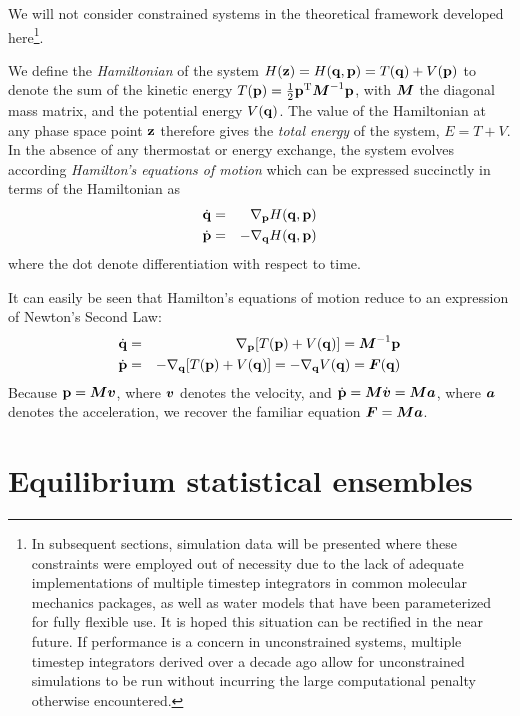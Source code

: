 We will not consider constrained systems in the theoretical framework developed here\footnote{In subsequent sections, simulation data will be presented where these constraints were employed out of necessity due to the lack of adequate implementations of multiple timestep integrators in common molecular mechanics packages, as well as water models that have been parameterized for fully flexible use.  It is hoped this situation can be rectified in the near future.  If performance is a concern in unconstrained systems, multiple timestep integrators derived over a decade ago \cite{tuckerman:1992a} allow for unconstrained simulations to be run without incurring the large computational penalty otherwise encountered.}.

We define the \emph{Hamiltonian} of the system $H({\bf z}) = H({\bf q},{\bf p}) = T({\bf q}) + V({\bf p})$ to denote the sum of the kinetic energy $T({\bf p}) = \frac{1}{2} {\bf p}^{\mathrm{T}} {\mbox{\boldmath{$M$}}}^{-1} {\bf p}$, with ${\mbox{\boldmath{$M$}}}$ the diagonal mass matrix, and the potential energy $V({\bf q})$.  \label{notation:Hamiltonian}
The value of the Hamiltonian at any phase space point ${\bf z}$ therefore gives the \emph{total energy} of the system, $E = T + V$.  \label{notation:total-energy}
In the absence of any thermostat or energy exchange, the system evolves according \emph{Hamilton's equations of motion} which can be expressed succinctly in terms of the Hamiltonian as  
\begin{eqnarray}
\dot{{\bf q}} &=& \nabla_{{\bf p}} H({\bf q},{\bf p}) \nonumber \\
\dot{{\bf p}} &=& - \nabla_{{\bf q}} H({\bf q},{\bf p})
\end{eqnarray}
where the dot denote differentiation with respect to time. 

It can easily be seen that Hamilton's equations of motion reduce to an expression of Newton's Second Law:
\begin{eqnarray}
\dot{{\bf q}} &=& \nabla_{{\bf p}} [T({\bf p}) + V({\bf q})] = {\mbox{\boldmath{$M$}}}^{-1} {\bf p} \nonumber \\
\dot{{\bf p}} &=& - \nabla_{{\bf q}} [T({\bf p}) + V({\bf q})] = - \nabla_{{\bf q}} V({\bf q}) = {\mbox{\boldmath{$F$}}}({\bf q})
\end{eqnarray}
Because ${\bf p} = {\mbox{\boldmath{$M$}}} {\mbox{\boldmath{$v$}}}$, where ${\mbox{\boldmath{$v$}}}$ denotes the velocity, and $\dot{{\bf p}} = {\mbox{\boldmath{$M$}}} \dot{{\mbox{\boldmath{$v$}}}} = {\mbox{\boldmath{$M$}}} {\mbox{\boldmath{$a$}}}$, where ${\mbox{\boldmath{$a$}}}$ denotes the acceleration, we recover the familiar equation ${\mbox{\boldmath{$F$}}} = {\mbox{\boldmath{$M$}}} {\mbox{\boldmath{$a$}}}$.  

\section{Equilibrium statistical ensembles}
  

